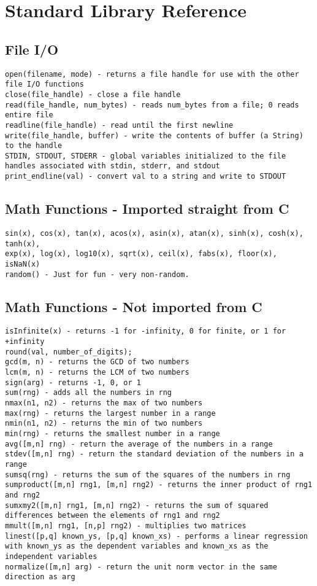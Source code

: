 \section{Standard Library Reference}

\subsection{File I/O}
\begin{lstlisting}
open(filename, mode) - returns a file handle for use with the other file I/O functions
close(file_handle) - close a file handle
read(file_handle, num_bytes) - reads num_bytes from a file; 0 reads entire file
readline(file_handle) - read until the first newline
write(file_handle, buffer) - write the contents of buffer (a String) to the handle
STDIN, STDOUT, STDERR - global variables initialized to the file handles associated with stdin, stderr, and stdout
print_endline(val) - convert val to a string and write to STDOUT
\end{lstlisting}

\subsection{Math Functions - Imported straight from C}
\begin{lstlisting}
sin(x), cos(x), tan(x), acos(x), asin(x), atan(x), sinh(x), cosh(x), tanh(x),
exp(x), log(x), log10(x), sqrt(x), ceil(x), fabs(x), floor(x), isNaN(x)
random() - Just for fun - very non-random.
\end{lstlisting}

\subsection{Math Functions - Not imported from C}
\begin{lstlisting}
isInfinite(x) - returns -1 for -infinity, 0 for finite, or 1 for +infinity
round(val, number_of_digits);
gcd(m, n) - returns the GCD of two numbers
lcm(m, n) - returns the LCM of two numbers
sign(arg) - returns -1, 0, or 1
sum(rng) - adds all the numbers in rng
nmax(n1, n2) - returns the max of two numbers
max(rng) - returns the largest number in a range
nmin(n1, n2) - returns the min of two numbers
min(rng) - returns the smallest number in a range
avg([m,n] rng) - return the average of the numbers in a range
stdev([m,n] rng) - return the standard deviation of the numbers in a range
sumsq(rng) - returns the sum of the squares of the numbers in rng
sumproduct([m,n] rng1, [m,n] rng2) - returns the inner product of rng1 and rng2
sumxmy2([m,n] rng1, [m,n] rng2) - returns the sum of squared differences between the elements of rng1 and rng2
mmult([m,n] rng1, [n,p] rng2) - multiplies two matrices
linest([p,q] known_ys, [p,q] known_xs) - performs a linear regression with known_ys as the dependent variables and known_xs as the independent variables
normalize([m,n] arg) - return the unit norm vector in the same direction as arg
\end{lstlisting}

